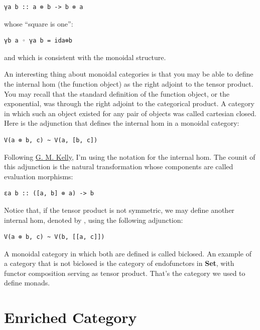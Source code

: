 \begin{verbatim}
γa b :: a ⊗ b -> b ⊗ a
\end{verbatim}

whose ``square is one'':

\begin{verbatim}
γb a ◦ γa b = ida⊗b
\end{verbatim}

and which is consistent with the monoidal structure.

An interesting thing about monoidal categories is that you may be able
to define the internal hom (the function object) as the right adjoint to
the tensor product. You may recall that the standard definition of the
function object, or the exponential, was through the right adjoint to
the categorical product. A category in which such an object existed for
any pair of objects was called cartesian closed. Here is the adjunction
that defines the internal hom in a monoidal category:

\begin{verbatim}
V(a ⊗ b, c) ~ V(a, [b, c])
\end{verbatim}

Following
\href{http://www.tac.mta.ca/tac/reprints/articles/10/tr10.pdf}{G. M.
Kelly}, I'm using the notation \code{{[}b,\ c{]}} for the internal
hom. The counit of this adjunction is the natural transformation whose
components are called evaluation morphisms:

\begin{verbatim}
εa b :: ([a, b] ⊗ a) -> b
\end{verbatim}

Notice that, if the tensor product is not symmetric, we may define
another internal hom, denoted by \code{{[}{[}a,\ c{]}{]}}, using the
following adjunction:

\begin{verbatim}
V(a ⊗ b, c) ~ V(b, [[a, c]])
\end{verbatim}

A monoidal category in which both are defined is called biclosed. An
example of a category that is not biclosed is the category of
endofunctors in \textbf{Set}, with functor composition serving as tensor
product. That's the category we used to define monads.

\section{Enriched Category}\label{enriched-category}

